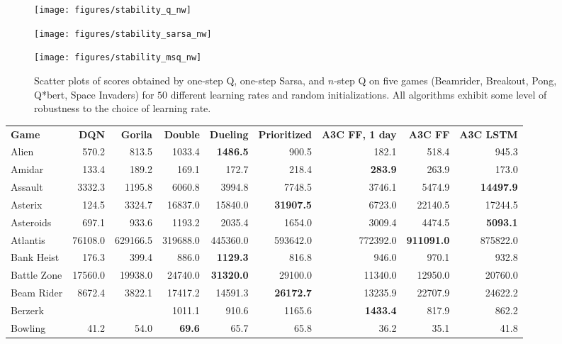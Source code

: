 \documentclass{article} \usepackage{times}
\begin{document}
\begin{figure}[t]
\centerline{\texttt{[image: figures/stability\_q\_nw]}}
\centerline{\texttt{[image: figures/stability\_sarsa\_nw]}}
\centerline{\texttt{[image: figures/stability\_msq\_nw]}}
\caption{\label{fig-stability-lr} Scatter plots of scores obtained by one-step Q, one-step Sarsa, and $n$-step Q on five games (Beamrider, Breakout, Pong, Q*bert, Space Invaders) for $50$ different learning rates and random initializations. All algorithms exhibit some level of robustness to the choice of learning rate.}
\end{figure}





\begin{table*}[h]
    \centering
    \begin{scriptsize}
    \begin{tabular}{lrrrrrrrr}
        \textbf{Game} & \textbf{DQN} & \textbf{Gorila} & \textbf{Double} & \textbf{Dueling} & \textbf{Prioritized} & \textbf{A3C FF, 1 day} & \textbf{A3C FF } & \textbf{A3C LSTM } \\
Alien & 570.2 & 813.5 & 1033.4 & \textbf{1486.5} & 900.5 & 182.1 & 518.4 & 945.3\\
Amidar & 133.4 & 189.2 & 169.1 & 172.7 & 218.4 & \textbf{283.9} & 263.9 & 173.0\\
Assault & 3332.3 & 1195.8 & 6060.8 & 3994.8 & 7748.5 & 3746.1 & 5474.9 & \textbf{14497.9}\\
Asterix & 124.5 & 3324.7 & 16837.0 & 15840.0 & \textbf{31907.5} & 6723.0 & 22140.5 & 17244.5\\
Asteroids & 697.1 & 933.6 & 1193.2 & 2035.4 & 1654.0 & 3009.4 & 4474.5 & \textbf{5093.1}\\
Atlantis & 76108.0 & 629166.5 & 319688.0 & 445360.0 & 593642.0 & 772392.0 & \textbf{911091.0} & 875822.0\\
Bank Heist & 176.3 & 399.4 & 886.0 & \textbf{1129.3} & 816.8 & 946.0 & 970.1 & 932.8\\
Battle Zone & 17560.0 & 19938.0 & 24740.0 & \textbf{31320.0} & 29100.0 & 11340.0 & 12950.0 & 20760.0\\
Beam Rider & 8672.4 & 3822.1 & 17417.2 & 14591.3 & \textbf{26172.7} & 13235.9 & 22707.9 & 24622.2\\
Berzerk &  &  & 1011.1 & 910.6 & 1165.6 & \textbf{1433.4} & 817.9 & 862.2\\
Bowling & 41.2 & 54.0 & \textbf{69.6} & 65.7 & 65.8 & 36.2 & 35.1 & 41.8\\

\end{tabular}
\end{scriptsize}
\end{table*}
\end{document}
